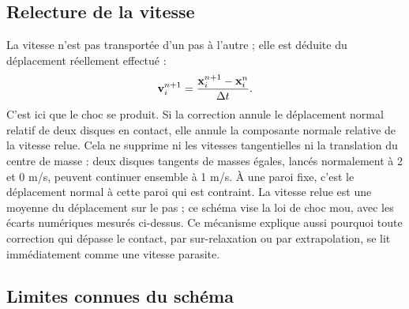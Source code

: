 \subsection{Relecture de la vitesse}

La vitesse n'est pas transportée d'un pas à l'autre ; elle est déduite du
déplacement réellement effectué :
\begin{equation}
\label{eq:relecture}
\mathbf{v}^{n+1}_i=\frac{\mathbf{x}^{n+1}_i-\mathbf{x}^n_i}{\Delta t}.
\end{equation}
C'est ici que le choc se produit. Si la correction annule le déplacement normal
relatif de deux disques en contact, elle annule la composante normale relative
de la vitesse relue. Cela ne supprime ni les vitesses tangentielles ni la
translation du centre de masse : deux disques tangents de masses égales, lancés
normalement à 2 et 0 m/s, peuvent continuer ensemble à 1 m/s. À une paroi fixe,
c'est le déplacement normal à cette paroi qui est contraint. La vitesse relue
est une moyenne du déplacement sur le pas ; ce schéma vise la loi de choc mou,
avec les écarts numériques mesurés ci-dessus. Ce mécanisme explique
aussi pourquoi toute correction qui dépasse le contact, par sur-relaxation ou
par extrapolation, se lit immédiatement comme une vitesse parasite.

\subsection{Limites connues du schéma}

